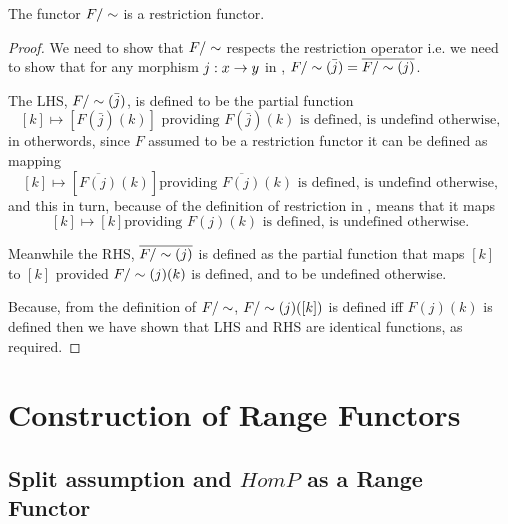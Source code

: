 \begin{lemma}
The functor $F/\sim$ is a restriction functor.
\end{lemma}
\begin{proof}
We need to show that  $F/\sim$ respects the restriction operator
i.e. we need to show that for any morphism $j:x \rightarrow y$ in \catcw, $F/\sim(\bar{j})= \overline{F/\sim(j)}$.

The LHS, $F/\sim(\bar{j})$, is defined to  be the partial function
$$ [k] \mapsto [F(\bar{j})(k)] \mbox{ providing $F(\bar{j})(k)$ is defined, is undefind otherwise,}$$
in otherwords, since  $F$ assumed to be a restriction functor it can be defined as mapping
$$ [k] \mapsto [\overline{F(j)}(k)] \mbox{providing $\overline{F(j)}(k)$ is defined, is undefind otherwise,}$$
and this in turn, because of the definition of restriction in \SetP, means that it maps
$$ [k] \mapsto [k] \mbox{providing $F(j)(k)$ is defined, is undefined otherwise.}$$

Meanwhile the RHS, $\overline{F/\sim(j)}$  is defined as the partial function that 
maps $[k]$  to $[k]$  provided  $F/\sim(j)(k)$ is defined, and to be undefined otherwise.

Because,
from the definition of $F/\sim$, $F/\sim(j)([k])$ is defined iff $F(j)(k)$ is defined then
we have shown that LHS and RHS are identical functions, as required.
\end{proof}

\section{Construction of Range Functors}

 \subsection{Split assumption and $HomP$ as a Range Functor}


